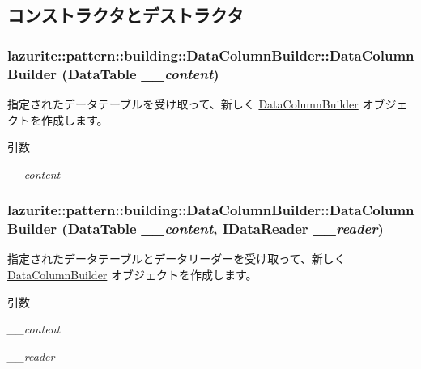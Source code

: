 \subsection{コンストラクタとデストラクタ}
\hypertarget{classlazurite_1_1pattern_1_1building_1_1_data_column_builder_aaca320aa6a173a52ed2a3e6cde3157de}{
\subsubsection[{DataColumnBuilder}]{\setlength{\rightskip}{0pt plus 5cm}lazurite::pattern::building::DataColumnBuilder::DataColumnBuilder (DataTable {\em \_\-\_\-content})}}
\label{classlazurite_1_1pattern_1_1building_1_1_data_column_builder_aaca320aa6a173a52ed2a3e6cde3157de}


指定されたデータテーブルを受け取って、新しく \hyperlink{classlazurite_1_1pattern_1_1building_1_1_data_column_builder}{DataColumnBuilder} オブジェクトを作成します。 
\begin{DoxyParams}{引数}
\item[{\em \_\-\_\-content}]\end{DoxyParams}
\hypertarget{classlazurite_1_1pattern_1_1building_1_1_data_column_builder_a650ecdc496195439ed1c6f69b82c7cd9}{
\subsubsection[{DataColumnBuilder}]{\setlength{\rightskip}{0pt plus 5cm}lazurite::pattern::building::DataColumnBuilder::DataColumnBuilder (DataTable {\em \_\-\_\-content}, \/  IDataReader {\em \_\-\_\-reader})}}
\label{classlazurite_1_1pattern_1_1building_1_1_data_column_builder_a650ecdc496195439ed1c6f69b82c7cd9}


指定されたデータテーブルとデータリーダーを受け取って、新しく \hyperlink{classlazurite_1_1pattern_1_1building_1_1_data_column_builder}{DataColumnBuilder} オブジェクトを作成します。 
\begin{DoxyParams}{引数}
\item[{\em \_\-\_\-content}]\item[{\em \_\-\_\-reader}]\end{DoxyParams}


